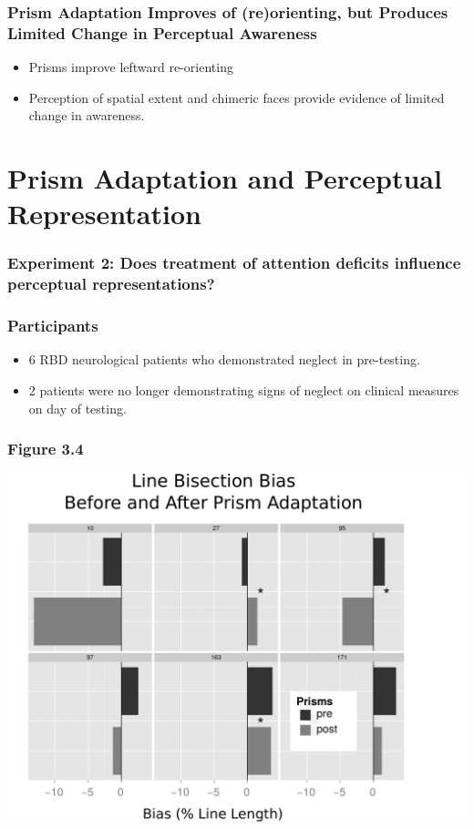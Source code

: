 \documentclass{beamer}
\begin{document}
\begin{frame}
	\frametitle{Prism Adaptation Improves of (re)orienting, but Produces Limited Change in Perceptual Awareness}
	\begin{itemize}
		\item Prisms improve leftward re-orienting
		\item Perception of spatial extent and chimeric faces provide evidence of limited change in awareness.
	\end{itemize}
\end{frame}

\section[Prisms]{Prism Adaptation and Perceptual Representation}

\begin{frame}
	\frametitle{Experiment 2: Does treatment of attention deficits influence perceptual representations?}
		\tableofcontents[currentsection]
\end{frame}


\begin{frame}
	\frametitle{Participants}
\begin{itemize}
	\item 6 RBD neurological patients who demonstrated neglect in pre-testing.
	\item 2 patients were no longer demonstrating signs of neglect on clinical measures on day of testing.
\end{itemize}
\end{frame}

\end{document}
